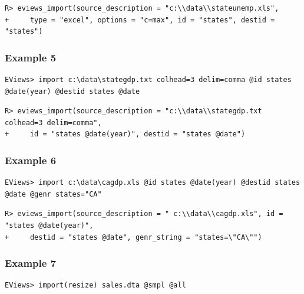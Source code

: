 \begin{verbatim}
R> eviews_import(source_description = "c:\\data\\stateunemp.xls",
+     type = "excel", options = "c=max", id = "states", destid = "states")
\end{verbatim}

\hypertarget{example-5-1}{%
\subsubsection{Example 5}\label{example-5-1}}

\begin{verbatim}
EViews> import c:\data\stategdp.txt colhead=3 delim=comma @id states @date(year) @destid states @date
\end{verbatim}

\begin{verbatim}
R> eviews_import(source_description = "c:\\data\\stategdp.txt colhead=3 delim=comma",
+     id = "states @date(year)", destid = "states @date")
\end{verbatim}

\hypertarget{example-6-1}{%
\subsubsection{Example 6}\label{example-6-1}}

\begin{verbatim}
EViews> import c:\data\cagdp.xls @id states @date(year) @destid states @date @genr states="CA"
\end{verbatim}

\begin{verbatim}
R> eviews_import(source_description = " c:\\data\\cagdp.xls", id = "states @date(year)",
+     destid = "states @date", genr_string = "states=\"CA\"")
\end{verbatim}

\hypertarget{example-7-1}{%
\subsubsection{Example 7}\label{example-7-1}}

\begin{verbatim}
EViews> import(resize) sales.dta @smpl @all
\end{verbatim}

